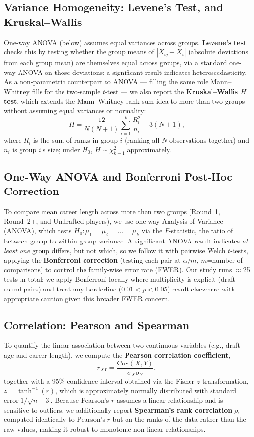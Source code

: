 \documentclass[10pt,twocolumn]{article}
\begin{document}
\subsection{Variance Homogeneity: Levene's Test, and Kruskal--Wallis}
One-way ANOVA (below) assumes equal variances across groups.
\textbf{Levene's test} checks this by testing whether the group means
of $|X_{ij} - \bar{X}_i|$ (absolute deviations from each group mean)
are themselves equal across groups, via a standard one-way ANOVA on
those deviations; a significant result indicates heteroscedasticity. As
a non-parametric counterpart to ANOVA --- filling the same role
Mann--Whitney fills for the two-sample $t$-test --- we also report the
\textbf{Kruskal--Wallis $H$ test}, which extends the Mann--Whitney
rank-sum idea to more than two groups without assuming equal variances
or normality:
\[
  H = \frac{12}{N(N+1)} \sum_{i=1}^{k} \frac{R_i^2}{n_i} - 3(N+1),
\]
where $R_i$ is the sum of ranks in group $i$ (ranking all $N$
observations together) and $n_i$ is group $i$'s size; under $H_0$,
$H \sim \chi^2_{k-1}$ approximately.

\subsection{One-Way ANOVA and Bonferroni Post-Hoc Correction}
To compare mean career length across more than two groups (Round~1,
Round~2+, and Undrafted players), we use one-way Analysis of Variance
(ANOVA), which tests
$H_0: \mu_1 = \mu_2 = \dots = \mu_k$
via the $F$-statistic, the ratio of between-group to within-group
variance. A significant ANOVA result indicates \textit{at least one}
group differs, but not which, so we follow it with pairwise Welch
$t$-tests, applying the \textbf{Bonferroni correction} (testing each
pair at $\alpha/m$, $m$=number of comparisons) to control the
family-wise error rate (FWER). Our study runs $\approx$25 tests in
total; we apply Bonferroni locally where multiplicity is explicit
(draft-round pairs) and treat any borderline ($0.01<p<0.05$) result
elsewhere with appropriate caution given this broader FWER concern.

\subsection{Correlation: Pearson and Spearman}
To quantify the linear association between two continuous variables
(e.g., draft age and career length), we compute the \textbf{Pearson
correlation coefficient},
\[
  r_{XY} = \frac{\mathrm{Cov}(X,Y)}{\sigma_X \sigma_Y},
\]
together with a 95\% confidence interval obtained via the Fisher
$z$-transformation, $z = \tanh^{-1}(r)$, which is approximately normally
distributed with standard error $1/\sqrt{n-3}$. Because Pearson's $r$
assumes a linear relationship and is sensitive to outliers, we
additionally report \textbf{Spearman's rank correlation} $\rho$, computed
identically to Pearson's $r$ but on the ranks of the data rather than the
raw values, making it robust to monotonic non-linear relationships.
\end{document}
